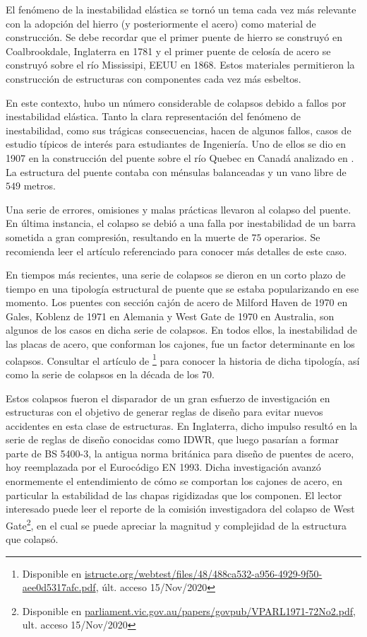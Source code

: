 El fenómeno de la inestabilidad elástica se tornó un tema cada vez más relevante con la adopción del hierro (y posteriormente el acero) como material de construcción. %
%
Se debe recordar que el primer puente de hierro se construyó en Coalbrookdale, Inglaterra en 1781 y el primer puente de celosía de acero se construyó sobre el río Mississipi, EEUU en 1868.  Estos materiales permitieron la construcción de estructuras con componentes cada vez más esbeltos. 

En este contexto, hubo un número considerable de colapsos debido a fallos por inestabilidad elástica. %
%
Tanto la clara representación del fenómeno de inestabilidad, como sus trágicas consecuencias, hacen de algunos fallos, casos de estudio típicos de interés para estudiantes de Ingeniería. %
%
Uno de ellos se dio en 1907 en la construcción del puente sobre el río Quebec en Canadá analizado en \citep{Brady}. %
%
La estructura del puente contaba con ménsulas balanceadas y un vano libre de $549$ metros. %

Una serie de errores, omisiones y malas prácticas llevaron al colapso del puente. En última instancia, el colapso se debió a una falla por inestabilidad de un barra sometida a gran compresión, resultando en la muerte de $75$ operarios. Se recomienda leer el artículo referenciado para conocer más detalles de este caso.

En tiempos más recientes, una serie de colapsos se dieron en un corto plazo de tiempo en una tipología estructural de puente que se estaba popularizando en ese momento. %
%
Los puentes con sección cajón de acero de Milford Haven de 1970 en Gales, Koblenz de 1971 en Alemania y West Gate de 1970 en Australia, son algunos de los casos en dicha serie de colapsos. %
%
En todos ellos, la inestabilidad de las placas de acero, que conforman los cajones, fue un factor determinante en los colapsos. %
%
Consultar el artículo de \cite{Firth}\footnote{Disponible en \href{https://www.istructe.org/webtest/files/48/488ca532-a956-4929-9f50-aee0d5317afc.pdf}{istructe.org/webtest/files/48/488ca532-a956-4929-9f50-aee0d5317afc.pdf}, últ. acceso 15/Nov/2020} para conocer la historia de dicha tipología, así como la serie de colapsos en la década de los 70.

Estos colapsos fueron el disparador de un gran esfuerzo de investigación en estructuras con el objetivo de generar reglas de diseño para evitar nuevos accidentes en esta clase de estructuras. %
%
En Inglaterra, dicho impulso resultó en la serie de reglas de diseño conocidas como IDWR, que luego pasarían a formar parte de BS 5400-3, la antigua norma británica para diseño de puentes de acero, hoy reemplazada por el Eurocódigo EN 1993. %
%
Dicha investigación avanzó enormemente el entendimiento de cómo se comportan los cajones de acero, en particular la estabilidad de las chapas rigidizadas que los componen. El lector interesado puede leer el reporte de la comisión investigadora del colapso de West Gate\footnote{Disponible en \href{http://www.parliament.vic.gov.au/papers/govpub/VPARL1971-72No2.pdf}{parliament.vic.gov.au/papers/govpub/VPARL1971-72No2.pdf}, ult. acceso 15/Nov/2020}, en el cual se puede apreciar la magnitud y complejidad de la estructura que colapsó. 

